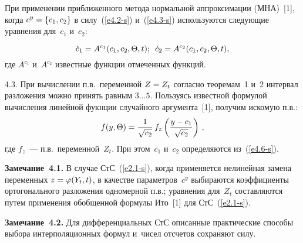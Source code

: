 \begin{multicols}{2}

При применении приближенного метода нормальной аппроксимации (МНА)~[1], 
когда $c^y\hm=\{c_1, c_2\}$ в силу~(\ref{e4.2-s}) и~(\ref{e4.3-s}) 
используются сле\-ду\-ющие уравнения для~$c_1$ и~$c_2$:

\noindent
  \begin{equation}
  \dot c_1 = A^{c_1} (c_1, c_2,\Theta, t);\enskip 
    \dot c_2 = A^{c_2} (c_1, c_2,\Theta, t),\label{e4.6-s}
    \end{equation}
где $A^{c_1}$ и~$A^{c_2}$ известные функции отмеченных функций.

4.3. При вычислении п.в.\ переменной $Z\hm=Z_t$ согласно теоремам~1 и~2 
интервал разложения можно принять равным $3\ldots5$. 
Пользуясь известной формулой вычисления линейной фукнции случайного аргумента~[1], 
получим искомую п.в.:
\begin{equation*}
f(y,\Theta)= \displaystyle\frac{\displaystyle 1\mathstrut}{\displaystyle \sqrt{c_2}\mathstrut}\,
     f_z \left( \displaystyle\frac{\displaystyle y-c_1\mathstrut}{\displaystyle \sqrt{c_2}\mathstrut} \right)\,,
     \end{equation*}
где $f_z$~--- п.в.\ переменной~$Z_t$. При этом~$c_1$ 
и~$c_2$ определяются из~(\ref{e4.6-s}).




\noindent
\textbf{Замечание~4.1.}
В случае СтС~(\ref{e2.1-s}), когда применяется нелинейная замена переменных  
$z\hm= \varphi
 (Y_t, t)$, в качестве параметров~$c^y$ выбираются коэффициенты 
ортогонального разложения одномерной п.в.; уравнения для~$Z_t$ составляются 
путем применения обобщенной формулы Ито~[1] для СтС~(\ref{e2.1-s}).



\noindent
\textbf{Замечание~4.2.}
Для дифференциальных СтС описанные практические способы выбора интерполяционных формул 
и~чисел отсчетов сохраняют силу.

\vspace*{-12pt}



\end{multicols}
